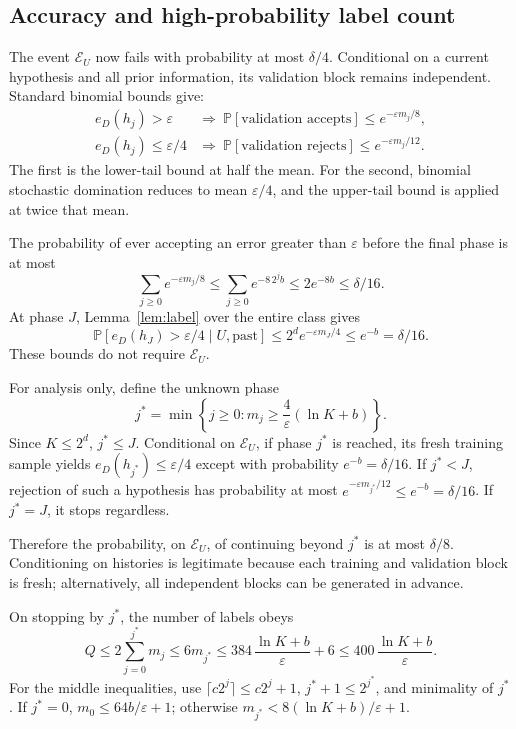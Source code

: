 \documentclass[11pt,a4paper]{article}
\newcommand{\Prb}{\mathbb P}
\begin{document}
\subsection{Accuracy and high-probability label count}

The event \(\mathcal E_U\) now fails with probability at most \(\delta/4\).
Conditional on a current hypothesis and all prior information, its
validation block remains independent. Standard binomial bounds give:
\[
 \begin{array}{ll}
 e_D(h_j)>\varepsilon
 &\Longrightarrow\
 \Prb[\text{validation accepts}]\le e^{-\varepsilon m_j/8},\\[3pt]
 e_D(h_j)\le\varepsilon/4
 &\Longrightarrow\
 \Prb[\text{validation rejects}]\le e^{-\varepsilon m_j/12}.
 \end{array}
\]
The first is the lower-tail bound at half the mean. For the second,
binomial stochastic domination reduces to mean \(\varepsilon/4\), and
the upper-tail bound is applied at twice that mean.

The probability of ever accepting an error greater than \(\varepsilon\)
before the final phase is at most
\[
 \sum_{j\ge0}e^{-\varepsilon m_j/8}
 \le\sum_{j\ge0}e^{-8\,2^j b}
 \le2e^{-8b}\le\delta/16.
\]
At phase \(J\), Lemma~\ref{lem:label} over the entire class gives
\[
 \Prb[e_D(h_J)>\varepsilon/4\mid U,\text{past}]
 \le 2^d e^{-\varepsilon m_J/4}
 \le e^{-b}=\delta/16.
\]
These bounds do not require \(\mathcal E_U\).

For analysis only, define the unknown phase
\[
 j^*=\min\left\{j\ge0:
       m_j\ge\frac4\varepsilon(\ln K+b)\right\}.
\]
Since \(K\le2^d\), \(j^*\le J\).
Conditional on \(\mathcal E_U\), if phase \(j^*\) is reached, its fresh
training sample yields \(e_D(h_{j^*})\le\varepsilon/4\) except with
probability \(e^{-b}=\delta/16\). If \(j^*<J\), rejection of such a
hypothesis has probability at most \(e^{-\varepsilon m_{j^*}/12}\le
e^{-b}=\delta/16\). If \(j^*=J\), it stops regardless.

Therefore the probability, on \(\mathcal E_U\), of continuing beyond
\(j^*\) is at most \(\delta/8\). Conditioning on histories is legitimate
because each training and validation block is fresh; alternatively,
all independent blocks can be generated in advance.

On stopping by \(j^*\), the number of labels obeys
\[
 Q\le2\sum_{j=0}^{j^*}m_j\le6m_{j^*}
 \le384\,\frac{\ln K+b}{\varepsilon}+6
 \le400\,\frac{\ln K+b}{\varepsilon}.
\]
For the middle inequalities, use \(\lceil c2^j\rceil\le c2^j+1\),
\(j^*+1\le2^{j^*}\), and minimality of \(j^*\).
If \(j^*=0\), \(m_0\le64b/\varepsilon+1\);
otherwise \(m_{j^*}<8(\ln K+b)/\varepsilon+1\).
\end{document}
